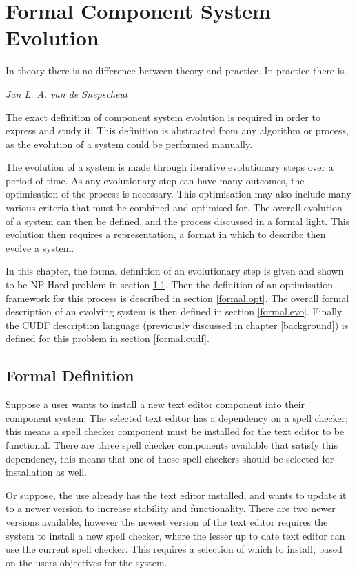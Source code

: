 \chapter{Formal Component System Evolution}
\label{formal}
\epigraph{In theory there is no difference between theory and practice. In practice there is.}
{\textit{Jan L. A. van de Snepscheut}}

The exact definition of component system evolution is required in order to express and study it.
This definition is abstracted from any algorithm or process, as the evolution of a system could be performed manually.

The evolution of a system is made through iterative evolutionary steps over a period of time.
As any evolutionary step can have many outcomes, the optimisation of the process is necessary.
This optimisation may also include many various criteria that must be combined and optimised for.
The overall evolution of a system can then be defined, and the process discussed in a formal light.
This evolution then requires a representation, a format in which to describe then evolve a system.

In this chapter, the formal definition of an evolutionary step is given and shown to be NP-Hard problem in section \ref{formal.step}.
Then the definition of an optimisation framework for this process is described in section \ref{formal.opt}.
The overall formal description of an evolving system is then defined in section \ref{formal.evo}.
Finally, the CUDF description language (previously discussed in chapter \ref{background}) is defined for this problem in section \ref{formal.cudf}.

\section{Formal Definition}
\label{formal.step}
Suppose a user wants to install a new text editor component into their component system.
The selected text editor has a dependency on a spell checker;
this means a spell checker component must be installed for the text editor to be functional.
There are three spell checker components available that satisfy this dependency,
this means that one of these spell checkers should be selected for installation as well.

Or suppose, the use already has the text editor installed, and wants to update it to a newer version to increase stability and functionality.
There are two newer versions available, however the newest version of the text editor requires the system to install a new spell checker,
where the lesser up to date text editor can use the current spell checker.
This requires a selection of which to install, based on the users objectives for the system.

